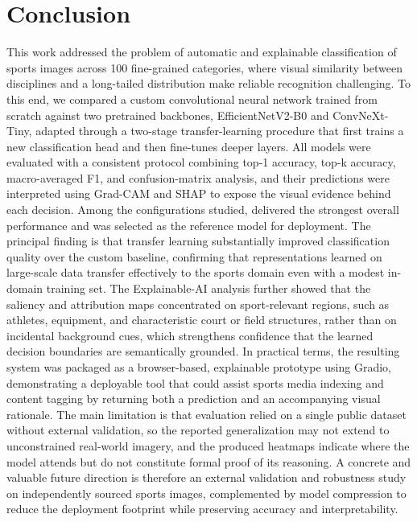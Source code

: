 \section{Conclusion}
This work addressed the problem of automatic and explainable classification of sports images across 100 fine-grained categories, where visual similarity between disciplines and a long-tailed distribution make reliable recognition challenging.
To this end, we compared a custom convolutional neural network trained from scratch against two pretrained backbones, EfficientNetV2-B0 and ConvNeXt-Tiny, adapted through a two-stage transfer-learning procedure that first trains a new classification head and then fine-tunes deeper layers.
All models were evaluated with a consistent protocol combining top-1 accuracy, top-k accuracy, macro-averaged F1, and confusion-matrix analysis, and their predictions were interpreted using Grad-CAM and SHAP to expose the visual evidence behind each decision.
Among the configurations studied, \bestModel{} delivered the strongest overall performance and was selected as the reference model for deployment.
The principal finding is that transfer learning substantially improved classification quality over the custom baseline, confirming that representations learned on large-scale data transfer effectively to the sports domain even with a modest in-domain training set.
The Explainable-AI analysis further showed that the saliency and attribution maps concentrated on sport-relevant regions, such as athletes, equipment, and characteristic court or field structures, rather than on incidental background cues, which strengthens confidence that the learned decision boundaries are semantically grounded.
In practical terms, the resulting system was packaged as a browser-based, explainable prototype using Gradio, demonstrating a deployable tool that could assist sports media indexing and content tagging by returning both a prediction and an accompanying visual rationale.
The main limitation is that evaluation relied on a single public dataset without external validation, so the reported generalization may not extend to unconstrained real-world imagery, and the produced heatmaps indicate where the model attends but do not constitute formal proof of its reasoning.
A concrete and valuable future direction is therefore an external validation and robustness study on independently sourced sports images, complemented by model compression to reduce the deployment footprint while preserving accuracy and interpretability.

